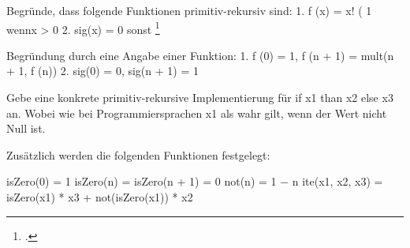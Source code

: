 \documentclass{bschlangaul-aufgabe}
\begin{document}

\begin{bAntwort}

\item Begründe, dass folgende Funktionen primitiv-rekursiv sind:
1. f (x) = x!
(
1 wennx > 0
2. sig(x) =
0 sonst
\footcite[Seite 7, Aufgabe 5]{theo:ab:4}

\begin{bAntwort}
Begründung durch eine Angabe einer Funktion:
1. f (0) = 1, f (n + 1) = mult(n + 1, f (n))
2. sig(0) = 0, sig(n + 1) = 1
\end{bAntwort}


\item Gebe eine konkrete primitiv-rekursive Implementierung für if x1 than x2 else
x3 an.
Wobei wie bei Programmiersprachen x1 als wahr gilt, wenn der Wert nicht Null
ist.

\begin{bAntwort}
 Zusätzlich werden die folgenden Funktionen festgelegt:

isZero(0) = 1
isZero(n) =
isZero(n + 1) = 0
not(n) = 1 − n
ite(x1, x2, x3) = isZero(x1) * x3 + not(isZero(x1)) * x2
\end{bAntwort}

\end{bAntwort}
\end{document}
